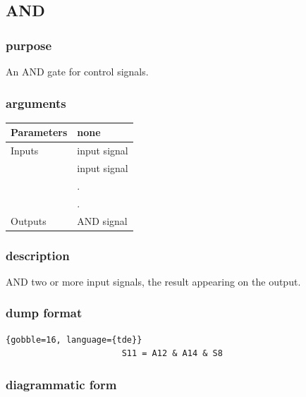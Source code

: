         \subsection{AND}

            \subsubsection{purpose}
            
                An AND gate for control signals.

            \subsubsection{arguments}
            
                \begin{tabular}{| l | l |}
                \hline
                Parameters  & none \\
                \hline
                Inputs      & input signal \\
                            & input signal \\
                            & . \\
                            & . \\
                \hline
                Outputs     & AND signal \\
                \hline
                \end{tabular}

            \subsubsection{description}
            
                AND two or more input signals, the result appearing on the
                output.

            \subsubsection{dump format}
            
                \begin{lstlisting}{gobble=16, language={tde}}
                       S11 = A12 & A14 & S8
                \end{lstlisting}

            \subsubsection{diagrammatic form}

